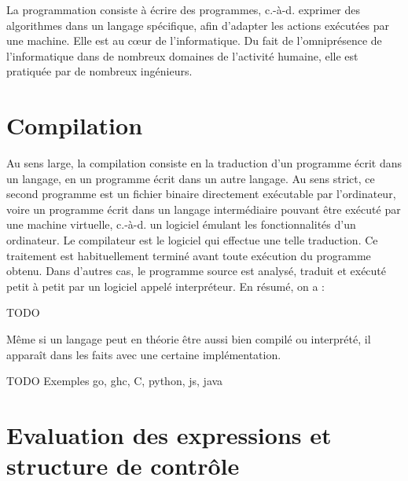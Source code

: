 \documentclass[a4paper,francais]{insalyon}
\newcommand{\cad}{c.-à-d.}
\begin{document}
La programmation consiste à écrire des programmes, {\cad} exprimer des algorithmes dans un langage spécifique, afin d'adapter les actions exécutées par une machine. Elle est au c\oe ur de l'informatique. Du fait de l'omniprésence de l'informatique dans de nombreux domaines de l'activité humaine, elle est pratiquée par de nombreux ingénieurs. 




\section{Compilation}

Au sens large, la compilation consiste en la traduction d'un programme écrit dans un langage, en un programme écrit dans un autre langage. Au sens strict, ce second programme est un fichier binaire directement exécutable par l'ordinateur, voire un programme écrit dans un langage intermédiaire pouvant être exécuté par une machine virtuelle, {\cad} un logiciel émulant les fonctionnalités d'un ordinateur. Le compilateur est le logiciel qui effectue une telle traduction. Ce traitement est habituellement terminé avant toute exécution du programme obtenu. Dans d'autres cas, le programme source est analysé, traduit et exécuté petit à petit par un logiciel appelé interpréteur. En résumé, on a :

TODO

Même si un langage peut en théorie être aussi bien compilé ou interprété, il apparaît dans les faits avec une certaine implémentation.  

TODO Exemples go, ghc, C, python, js, java




\section{Evaluation des expressions et structure de contrôle}
\end{document}
